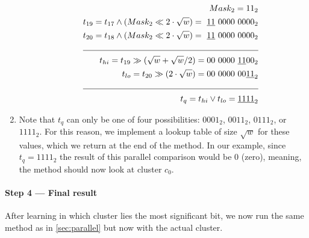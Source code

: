 \begin{enumerate}
\begin{enumerate}
        \begin{align*}
            Mask_2 = 11_2&\\
            t_{19} = t_{17} \wedge (Mask_2 \ll 2\cdot \sqrt{w}) =\ \underline{11}\ 0000\ 0000_2& \\
            t_{20} = t_{18} \wedge (Mask_2 \ll 2\cdot \sqrt{w}) =\ \underline{11}\ 0000\ 0000_2& \\
            \cline{1-2}
            t_{hi} = t_{19} \gg (\sqrt{w} + \sqrt{w}/2) = 00\ 0000\ \underline{11}00_2 &\\
            t_{lo} = t_{20} \gg (2\cdot \sqrt{w}) = 00\ 0000\ 00 \underline{11}_2 &\\
            \cline{1-2}
            t_{q} = t_{hi} \vee t_{lo} = \underline{1111}_2 &\\
        \end{align*}
    \end{enumerate}
    \item
    Note that $t_q$ can only be one of four possibilities: $0001_2$, $0011_2$, $0111_2$, or $1111_2$. For this reason, we implement a lookup table of size $\sqrt{w}$ for these values, which we return at the end of the method. In our example, since $t_{q} = 1111_2$ the result of this parallel comparison would be $0$ (zero), meaning, the method should now look at cluster $c_0$.
\end{enumerate}

\paragraph{Step 4 --- Final result}
After learning in which cluster lies the most significant bit, we now run the same method as in \ref{sec:parallel} but now with the actual cluster.

